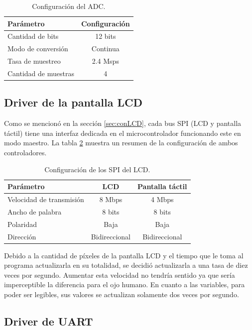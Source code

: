 \begin{table}[H]
	\centering
	\caption{Configuración del ADC.}
	\begin{tabular}{l c}
		\toprule
		\textbf{Parámetro} & \textbf{Configuración}  \\
		\midrule
		Cantidad de bits		& 12 bits 	 		 \\
		Modo de conversión		& Continua   \\
		Tasa de muestreo		& 2.4 Msps				 \\
		Cantidad de muestras	& 4 \\
		\bottomrule
		\hline
	\end{tabular}
	\label{tab:configADC}
\end{table}


\subsection{Driver de la pantalla LCD}

Como se mencionó en la sección \ref{sec:conLCD}, cada bus SPI (LCD y pantalla táctil) tiene una interfaz dedicada en el microcontrolador funcionando este en modo maestro. La tabla \ref{tab:configSPI} muestra un resumen de la configuración de ambos controladores.

\begin{table}[H]
	\centering
	\caption{Configuración de los SPI del LCD.}
	\begin{tabular}{l c c}
		\toprule
		\textbf{Parámetro} & \textbf{LCD} & \textbf{Pantalla táctil} \\
		\midrule
		Velocidad de transmisión	& 8 Mbps & 4 Mbps	\\
		Ancho de palabra 				& 8 bits & 8 bits	    \\
		Polaridad							& Baja & Baja \\
		Dirección							& Bidireccional & Bidireccional \\
		\bottomrule
		\hline
	\end{tabular}
	\label{tab:configSPI}
\end{table}

Debido a la cantidad de píxeles de la pantalla LCD y el tiempo que le toma al programa actualizarla en su totalidad, se decidió actualizarla a una tasa de diez veces por segundo. Aumentar esta velocidad no tendría sentido ya que sería imperceptible la diferencia para el ojo humano. En cuanto a las variables, para poder ser legibles, sus valores se actualizan solamente dos veces por segundo.

\subsection{Driver de UART}

